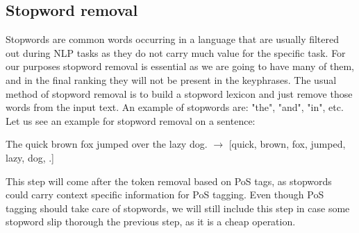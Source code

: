 \documentclass[12pt]{article}
\numberwithin{equation}{section}
\begin{document}
\begin{spacing}{1.5}
	\subsection{Stopword removal}
	Stopwords are common words occurring in a language that are usually filtered out during NLP tasks as they do not carry much value for the specific task. For our purposes stopword removal is essential as we are going to have many of them, and in the final ranking they will not be present in the keyphrases. The usual method of stopword removal is to build a stopword lexicon and just remove those words from the input text. An example of stopwords are: "the", "and", "in", etc. Let us see an example for stopword removal on a sentence:
	\begin{center}
		The quick brown fox jumped over the lazy dog. $\rightarrow$ [quick, brown, fox, jumped, lazy, dog, .]
	\end{center} 
	This step will come after the token removal based on PoS tags, as stopwords could carry context specific information for PoS tagging. Even though PoS tagging should take care of stopwords, we will still include this step in case some stopword slip thorough the previous step, as it is a cheap operation.
	

\end{spacing}
\end{document}
